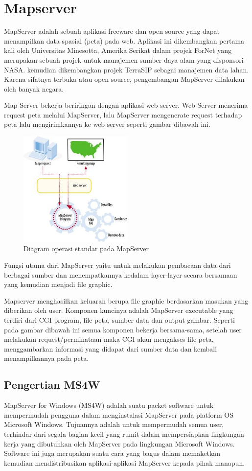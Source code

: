 \section{Mapserver}
MapServer adalah sebuah aplikasi freeware dan open source yang dapat menampilkan data spasial (peta) pada web. Aplikasi ini dikembangkan pertama kali oleh Universitas Minesotta, Amerika Serikat dalam projek ForNet yang merupakan sebuah projek untuk manajemen sumber daya alam yang disponsori NASA. kemudian dikembangkan projek TerraSIP sebagai manajemen data lahan. Karena sifatnya terbuka atau open source, pengembangan MapServer dilakukan oleh banyak negara.

Map Server bekerja beriringan dengan aplikasi web server. Web Server menerima request peta melalui MapServer, lalu MapServer mengenerate request terhadap peta lalu mengirimkannya ke web server seperti gambar dibawah ini.
\begin{figure}[ht]
	    \centerline{\includegraphics[width=0.50\textwidth]{figures/gambar5.JPG}}
	    \caption{Diagram operasi standar pada MapServer}
		\label{gambar5}
		\end{figure}
Fungsi utama dari MapServer yaitu untuk melakukan pembacaan data dari berbagai sumber dan menempatkannya kedalam layer-layer secara bersamaan yang kemudian menjadi file graphic.

Mapserver menghasilkan keluaran berupa file graphic berdasarkan masukan yang diberikan oleh user. Komponen kuncinya adalah MapServer executable yang terdiri dari CGI program, file peta, sumber data dan output gambar. Seperti pada gambar dibawah ini semua komponen bekerja bersama-sama, setelah user melakukan request/perminataan maka CGI akan mengakses file peta, menggambarkan informasi yang didapat dari sumber data dan kembali menampilkannya pada peta.

\subsection{Pengertian MS4W}
MapServer for Windows (MS4W) adalah suatu packet software untuk mempermudah pengguna dalam menginstalasi MapServer pada platform OS Microsoft Windows. Tujuannya adalah untuk mempermudah semua user, terhindar dari segala bagian kecil yang rumit dalam mempersiapkan lingkungan kerja yang dibutuhkan oleh MapServer pada lingkungan Microsoft Windows. Software ini juga merupakan suatu cara yang bagus dalam memaketkan kemudian mendistribusikan aplikasi-aplikasi MapServer kepada pihak manapun.


